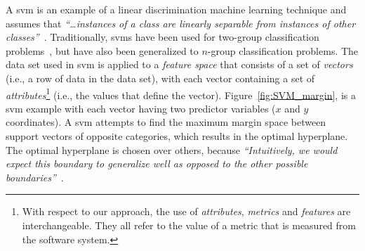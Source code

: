 A \gls{svm} is an example of a linear discrimination machine learning technique and assumes that \emph{``\ldots instances of a class are linearly separable from instances of other classes''}~\cite{ALP04}. Traditionally, \gls{svm}s have been used for two-group classification problems~\cite{CV95}, but have also been generalized to $n$-group classification problems. The data set used in \gls{svm} is applied to a \emph{feature space} that consists of a set of \emph{vectors} (i.e., a row of data in the data set), with each vector containing a set of \emph{attributes}\footnote{With respect to our approach, the use of \emph{attributes}, \emph{metrics} and \emph{features} are interchangeable. They all refer to the value of a metric that is measured from the software system.} (i.e., the values that define the vector). Figure~\ref{fig:SVM_margin}, is a \gls{svm} example with each vector having two predictor variables ($x$ and $y$ coordinates). A \gls{svm} attempts to find the maximum margin space between support vectors of opposite categories, which results in the optimal hyperplane. The optimal hyperplane is chosen over others, because \emph{``Intuitively, we would expect this boundary to generalize well as opposed to the other possible boundaries''}~\cite{Gun98}.

